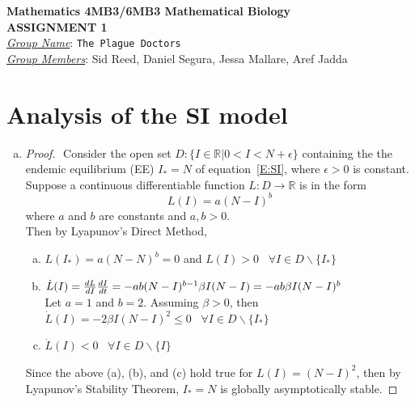 \documentclass[12pt]{article}
\begin{document}
\begin{center}
{\bfseries Mathematics 4MB3/6MB3 Mathematical Biology\\
 ASSIGNMENT {\color{blue}1}}\\
\medskip
\underline{\emph{Group Name}}: \texttt{{\color{blue}The Plague Doctors}}\\
\medskip
\underline{\emph{Group Members}}: {\color{blue}Sid Reed, Daniel Segura, Jessa Mallare, Aref Jadda}
\end{center}
\section{Analysis of the SI model}

\SIanalIntro
\begin{enumerate}[(a)]
\item \SIanalQa

  {\color{blue}
    \begin{proof}
      $ $\newline	
      Consider the open set $D: \{I\in \mathds{R}| 0 < I < N+\epsilon \}$ containing the the endemic equilibrium (EE) $I_* = N$ of        equation~\eqref{E:SI}, where $\epsilon > 0$ is constant. 
      Suppose a continuous differentiable function $L:D\rightarrow \mathds{R}$  is in the form 
      \begin{equation}
      L(I) = a(N-I)^b
      \end{equation} where $a$ and $b$ are constants and $a, b > 0$.\\
      
      Then by Lyapunov's Direct Method,
      \begin{enumerate}[(a)]
      	\item $L(I_*) = a(N-N)^b = 0$ and $L(I)>0$ \, $\forall I\in D\backslash \{I_*\}$
      	\item $\dot{L}(I)=\frac{dL}{dI}\frac{dI}{dt} \\
      	=-ab(N-I)^{b-1}\beta I(N-I)\\
      	=-ab\beta I(N-I)^b$\\
      	Let $a = 1$ and $b = 2$. Assuming $\beta>0$, then\\
      	$\dot{L}(I) = -2\beta I(N-I)^2 \leq 0$ \, $\forall I\in D\backslash \{I_*\}$
      	\item $\dot{L}(I) < 0$ \, $\forall I\in D\backslash \{I\}$
      \end{enumerate}
  	  Since the above (a), (b), and (c) hold true for $L(I) = (N-I)^2$, then by Lyapunov's Stability Theorem, $I_* = N$ is globally asymptotically stable. 
    \end{proof}
  }


\end{enumerate}
\end{document}
